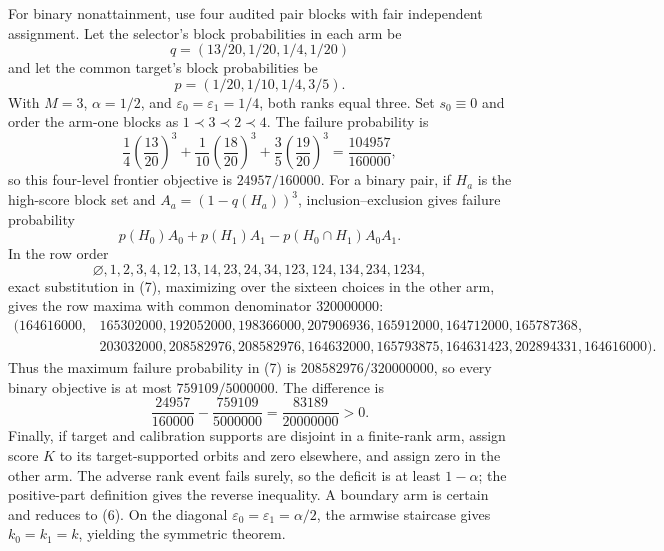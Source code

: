 For binary nonattainment, use four audited pair blocks with fair independent assignment. Let the selector's block probabilities in each arm be
\[
q=(13/20,1/20,1/4,1/20)
\]
and let the common target's block probabilities be
\[
p=(1/20,1/10,1/4,3/5).
\]
With \(M=3\), \(\alpha=1/2\), and \(\varepsilon_0=\varepsilon_1=1/4\), both ranks equal three. Set \(s_0\equiv0\) and order the arm-one blocks as \(1\prec3\prec2\prec4\). The failure probability is
\[
\frac14\left(\frac{13}{20}\right)^3
+\frac1{10}\left(\frac{18}{20}\right)^3
+\frac35\left(\frac{19}{20}\right)^3
=\frac{104957}{160000},
\]
so this four-level frontier objective is \(24957/160000\). For a binary pair, if \(H_a\) is the high-score block set and \(A_a=(1-q(H_a))^3\), inclusion--exclusion gives failure probability
\[
p(H_0)A_0+p(H_1)A_1-p(H_0\cap H_1)A_0A_1.
\tag{7}
\]
In the row order
\[
\varnothing,1,2,3,4,12,13,14,23,24,34,123,124,134,234,1234,
\]
exact substitution in (7), maximizing over the sixteen choices in the other arm, gives the row maxima with common denominator \(320000000\):
\[
\begin{split}
(164616000,&165302000,192052000,198366000,207906936,165912000,164712000,165787368,\\
&203032000,208582976,208582976,164632000,165793875,164631423,202894331,164616000).
\end{split}
\tag{8}
\]
Thus the maximum failure probability in (7) is \(208582976/320000000\), so every binary objective is at most \(759109/5000000\). The difference is
\[
\frac{24957}{160000}-\frac{759109}{5000000}
=\frac{83189}{20000000}>0.
\]
Finally, if target and calibration supports are disjoint in a finite-rank arm, assign score \(K\) to its target-supported orbits and zero elsewhere, and assign zero in the other arm. The adverse rank event fails surely, so the deficit is at least \(1-\alpha\); the positive-part definition gives the reverse inequality. A boundary arm is certain and reduces to (6). On the diagonal \(\varepsilon_0=\varepsilon_1=\alpha/2\), the armwise staircase gives \(k_0=k_1=k\), yielding the symmetric theorem.